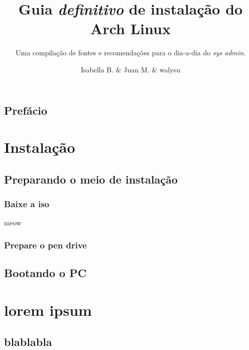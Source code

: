 \documentclass[dark, index]{Iart}
\title{Guia \textit{definitivo} de instalação do \textbf{\color{theme}Arch Linux}}
\subtitle{Uma compilação de fontes e recomendações para o dia-a-dia do \textit{sys admin}.}
\author{Isabella B. \email{isabellabdoamaral@usp.br} \& Juan M. \email{seu@email.com} \& walysu \email{seu@tbm.br}}
\begin{document}
	
	\maketitle
	
	\chapter*{Prefácio}
	
	
	\part{Instalação}
	
	\chapter{Preparando o meio de instalação}
	
	\section{Baixe a iso}
		
	\begin{citemize}
		\item meow
	\end{citemize}
	
	\ort %
	\nott %
	\avdt %
		
	\kant[1-10]
		
	\section{Prepare o pen drive}
		
	\chapter{Bootando o PC}
	
	\part{lorem ipsum}
	
	\chapter{blablabla}
	
\end{document}
